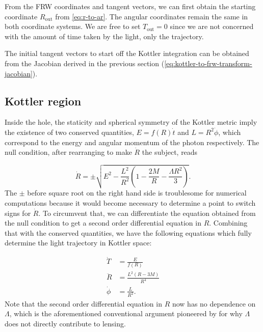 From the FRW coordinates and tangent vectors, we can first obtain the starting coordinate $R_{\text{out}}$ from \autoref{eq:r-to-ar}. The angular coordinates remain the same in both coordinate systems. We are free to set $T_{\text{out}} = 0$ since we are not concerned with the amount of time taken by the light, only the trajectory. 

The initial tangent vectors to start off the Kottler integration can be obtained from the Jacobian derived in the previous section (\autoref{eq:kottler-to-frw-transform-jacobian}).

\subsection{Kottler region}

Inside the hole, the staticity and spherical symmetry of the Kottler metric imply the existence of two conserved quantities, $E = f(R) \dot{t}$ and $L = R^2 \dot{\phi}$, which correspond to the energy and angular momentum of the photon respectively. The null condition, after rearranging to make $\dot{R}$ the subject, reads

\begin{equation}
  \dot{R} = \pm \sqrt{E^2 - \frac{L^2}{R^2} \left ( 1 - \frac{2M}{R} - \frac{\Lambda R^2}{3}\right )}.
  \label{eq:kottler-null-condition}
\end{equation}
The $\pm$ before square root on the right hand side is troublesome for numerical computations because it would become necessary to determine a point to switch signs for $\dot{R}$. To circumvent that, we can differentiate the equation obtained from the null condition to get a second order differential equation in $R$. Combining that with the conserved quantities, we have the following equations which fully determine the light trajectory in Kottler space:

\begin{subequations}
  \begin{align}
    \dot{T} &= \frac{E}{f(R)}\\
    \ddot{R}  &= \frac{L^2 (R-3M)}{R^4}\\
    \dot{\phi} &= \frac{L}{R^2}.
  \end{align}
  \label{eq:kottler-null-geodesics}%
\end{subequations}
Note that the second order differential equation in $R$ now has no dependence on $\Lambda$, which is the aforementioned conventional argument pioneered by \citet{islam1983cosmological} for why $\Lambda$ does not directly contribute to lensing. 


